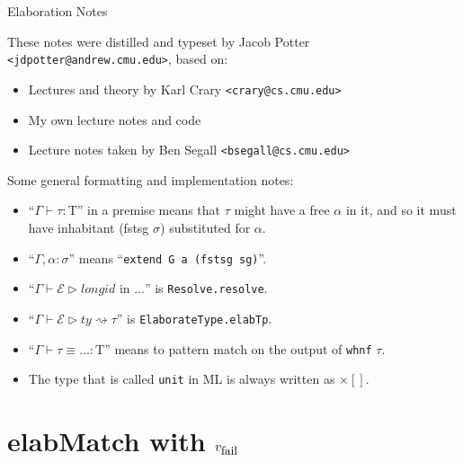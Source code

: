 \documentclass{article}
\begin{document}
\newcommand{\elabMatch}[1]{#1 \textrm{ on } v : \tau_1 \textrm{ with } \vfail}
\newcommand{\elabPat}[1]{#1 \textrm{ on } e : \tau \textrm{ with } \vfail}
\newcommand{\ex}{\textrm{exp}}
\newcommand{\T}{\textrm{T}}
\newcommand{\sq}{\rightsquigarrow}
\newcommand{\E}{\mathcal{E}} 
\newcommand{\tr}{\triangleright}
\newcommand{\vfail}{v_\textrm{\small fail}}
\newcommand{\afail}{\alpha_\textrm{\small fail}}
\newcommand{\mfail}{m_\textrm{\small fail}}
\newcommand{\Min}[1]{\textrm{in}_{#1}}
\newcommand{\sandw}[1]{\triangleleft #1 \triangleright}
\newcommand{\unit}{{\times[]}}
\newcommand{\dec}{\textrm{dec}}
\newcommand{\headp}[1]{\llparenthesis\, #1\, \rrparenthesis}

\begin{center}
\LARGE { Elaboration Notes }
\end{center}

These notes were distilled and typeset by Jacob Potter \texttt{<jdpotter@andrew.cmu.edu>}, based on:
\begin{itemize}
\item Lectures and theory by Karl Crary \texttt{<crary@cs.cmu.edu>}
\item My own lecture notes and code
\item Lecture notes taken by Ben Segall \texttt{<bsegall@cs.cmu.edu>}
\end{itemize}

Some general formatting and implementation notes:

\begin{itemize}
\item ``$\Gamma \vdash \tau : \T$'' in a premise means that $\tau$ might have a free $\alpha$ in it, and so it must have inhabitant (fstsg $\sigma$) substituted for $\alpha$.
\item ``$\Gamma, \alpha:\sigma$'' means ``\texttt{extend G a (fstsg sg)}''.
\item ``$\Gamma \vdash \E \tr longid \textrm { in ...}$'' is \texttt{Resolve.resolve}.
\item ``$\Gamma \vdash \E \tr  ty\rightsquigarrow \tau$'' is \texttt{ElaborateType.elabTp}. 
\item ``$\Gamma \vdash \tau \equiv ... : \textrm{T}$'' means to pattern match on the output of \texttt{whnf} $\tau$.
\item The type that is called \texttt{unit} in ML is always written as $\unit$.
\end{itemize}

\section{elabMatch with $\vfail$}
\end{document}
